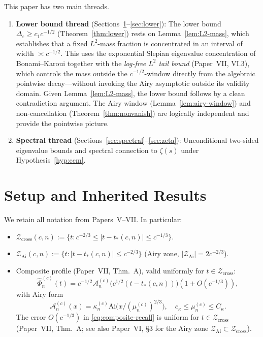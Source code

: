 \documentclass[12pt,a4paper]{amsart}
\theoremstyle{definition}
\theoremstyle{remark}
\newcommand{\Phihat}{\widehat{\Phi}}
\newcommand{\Ai}{\mathrm{Ai}}
\newcommand{\Zcross}{\mathcal{Z}_{\mathrm{cross}}}
\newcommand{\Zai}{\mathcal{Z}_{\mathrm{Ai}}}
\newcommand{\tstar}{t_*(c,n)}
\begin{document}
This paper has two main threads.
\begin{enumerate}
\item \textbf{Lower bound thread}
(Sections~\ref{sec:setup}--\ref{sec:lower}):
The lower bound $\Delta_\varepsilon\ge c_1 c^{-1/2}$
(Theorem~\ref{thm:lower}) rests on
Lemma~\ref{lem:L2-mass}, which establishes
that a fixed $L^2$-mass fraction is concentrated
in an interval of width $\asymp c^{-1/2}$.
This uses the exponential Slepian eigenvalue
concentration of Bonami--Karoui \cite{BonamiKaroui2014}
together with the \emph{log-free $L^2$ tail bound}
(Paper~VII, VI.3), which controls the mass outside
the $c^{-1/2}$-window directly from the algebraic
pointwise decay---without invoking the Airy
asymptotic outside its validity domain.
Given Lemma~\ref{lem:L2-mass}, the lower bound
follows by a clean contradiction argument.
The Airy window (Lemma~\ref{lem:airy-window})
and non-cancellation
(Theorem~\ref{thm:nonvanish}) are logically
independent and provide the pointwise picture.
\item \textbf{Spectral thread}
(Sections~\ref{sec:spectral}--\ref{sec:zeta}):
Unconditional two-sided eigenvalue bounds
and spectral connection to $\zeta(s)$
under Hypothesis~\ref{hyp:ccm}.
\end{enumerate}

\tableofcontents

\section{Setup and Inherited Results}
\label{sec:setup}

We retain all notation from Papers~V--VII.
In particular:
\begin{itemize}
\item $\Zcross(c,n):=\{t:c^{-2/3}\le|t-\tstar|\le c^{-1/3}\}$.
\item $\Zai(c,n):=\{t:|t-\tstar|\le c^{-2/3}\}$
      (Airy zone, $|\Zai|=2c^{-2/3}$).
\item Composite profile (Paper~VII, Thm.~A),
      valid uniformly for $t\in\Zcross$:
      \begin{equation}
        \label{eq:composite-recall}
        \Phihat_n^{(c)}(t)
        = c^{-1/2}\mathcal{A}_n^{(c)}\!\bigl(c^{1/2}(t-\tstar)\bigr)
        (1 + O(c^{-1/3})),
      \end{equation}
      with Airy form
      \begin{equation}\label{eq:Airy-form}
        \mathcal{A}_n^{(c)}(x)
        = \kappa_n^{(c)}\Ai\!\bigl(x/(\mu_n^{(c)})^{2/3}\bigr),
        \quad c_\kappa\le\mu_n^{(c)}\le C_\kappa.
      \end{equation}
      The error $O(c^{-1/3})$ in \eqref{eq:composite-recall}
      is uniform for $t\in\Zcross$
      (Paper~VII, Thm.~A; see also Paper~VI, \S3
      for the Airy zone $\Zai\subset\Zcross$).
\end{itemize}
\end{document}
